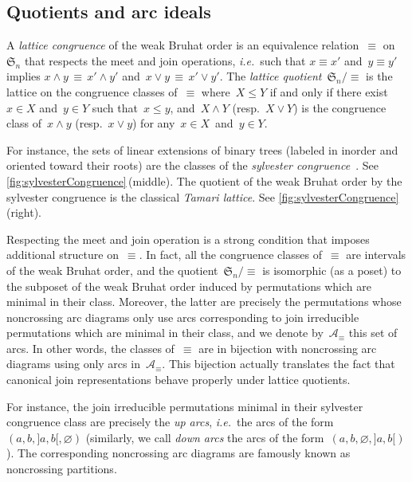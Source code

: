 \documentclass{amsart}
\theoremstyle{definition}
\renewcommand{\c}[1]{\mathcal{#1}} %
\newcommand{\f}[1]{\mathfrak{#1}} %
\newcommand{\ie}{\textit{i.e.}~} %
\newcommand{\darkblue}{\color{darkblue}} %
\newcommand{\defn}[1]{\textsl{\darkblue #1}} %
\newcommand{\meet}{\wedge} %
\newcommand{\join}{\vee} %
\begin{document}

\subsection{Quotients and arc ideals}
\label{subsec:arcIdeals}

A \defn{lattice congruence} of the weak Bruhat order is an equivalence relation~$\equiv$ on~$\f{S}_n$ that respects the meet and join operations, \ie such that $x \equiv x'$ and~$y \equiv y'$ implies $x \meet y \, \equiv \, x' \meet y'$ and~$x \join y \, \equiv \, x' \join y'$.
The \defn{lattice quotient}~$\f{S}_n/{\equiv}$ is the lattice on the congruence classes of~$\equiv$ where~$X \le Y$ if and only if there exist~$x \in X$ and~$y \in Y$ such that~$x \le y$, and~$X \meet Y$ (resp.~$X \join Y$) is the congruence class of~$x \meet y$ (resp.~$x \join y$) for any~$x \in X$~and~$y \in Y$.

For instance, the sets of linear extensions of binary trees (labeled in inorder and oriented toward their roots) are the classes of the \defn{sylvester congruence}~\cite{HivertNovelliThibon-binarySearchTrees}.
See \cref{fig:sylvesterCongruence}\,(middle).
The quotient of the weak Bruhat order by the sylvester congruence is the classical \defn{Tamari lattice}.
See \cref{fig:sylvesterCongruence}\,(right).

Respecting the meet and join operation is a strong condition that imposes additional structure on~$\equiv$.
In fact, all the congruence classes of~$\equiv$ are intervals of the weak Bruhat order, and the quotient~$\f{S}_n/{\equiv}$ is isomorphic (as a poset) to the subposet of the weak Bruhat order induced by permutations which are minimal in their class.
Moreover, the latter are precisely the permutations whose noncrossing arc diagrams only use arcs corresponding to join irreducible permutations which are minimal in their class, and we denote by~$\c{A}_\equiv$ this set of arcs.
In other words, the classes of~$\equiv$ are in bijection with noncrossing arc diagrams using only arcs in~$\c{A}_\equiv$.
This bijection actually translates the fact that canonical join representations behave properly under lattice quotients.

For instance, the join irreducible permutations minimal in their sylvester congruence class are precisely the \defn{up arcs}, \ie the arcs of the form~$(a, b, {]a,b[}, \varnothing)$ (similarly, we call \defn{down arcs} the arcs of the form~$(a, b, \varnothing, {]a,b[})$
).
The corresponding noncrossing arc diagrams are famously known as noncrossing partitions.
\end{document}
